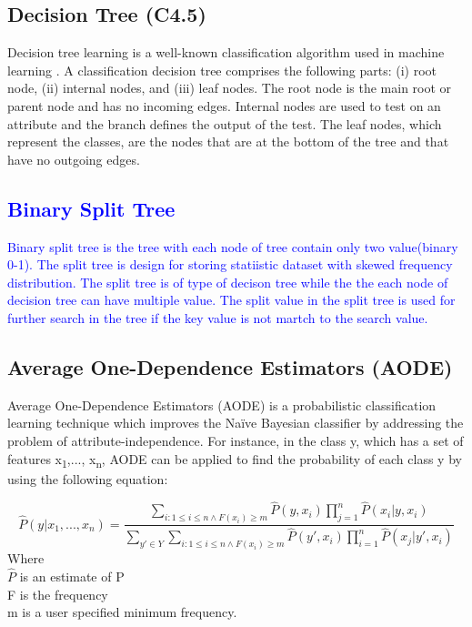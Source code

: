 \documentclass[review]{elsarticle}
\begin{document}
\subsection{Decision Tree (C4.5)}
\label{subsec:DT}
Decision tree learning is a well-known classification algorithm used in machine learning \cite{Quinlan1986}. A classification decision tree comprises the following parts: (i) root node, (ii) internal nodes, and (iii) leaf nodes. The root node is the main root or parent node and has no incoming edges. Internal nodes are used to test on an attribute and the branch defines the output of the test. The leaf nodes, which represent the classes, are the nodes that are at the bottom of the tree and that have no outgoing edges.
\textcolor{blue}{
\subsection{Binary Split Tree}
\label{subsec:BST}
Binary split tree is the tree with each node of tree contain only two value(binary 0-1). The split tree is design for storing statiistic dataset with skewed frequency distribution. The split tree is of type of decison tree while the the each node of decision tree can have multiple value. The split value in the split tree is used for further search in
the tree if the key value is not martch to the search value.  
}
\subsection{Average One-Dependence Estimators (AODE)}
\label{subsec:AODE}
Average One-Dependence Estimators (AODE) is a probabilistic classification learning technique which improves the Na\"ive Bayesian classifier \cite{Webb2005} by addressing the problem of attribute-independence. For instance, in the class y, which has a set of features x\textsubscript{1},..., x\textsubscript{n}, AODE can be applied to find the probability of each class y by using the following equation:
	
 	\begin{equation}
 	\hat{P}(y|x_1,...,x_n) = \dfrac{\sum_{i:1\leq i\leq n \wedge F(x_i) \geq m} \hat{P}(y,x_i)\prod_{j=1}^n \hat{P}(x_i|y,x_i)}{ \sum_{y'\in Y}  \sum_{i:1\leq i\leq n \wedge F(x_i) \geq m} \hat{P}(y',x_i) \prod_{i=1}^n \hat{P}(x_j|y',x_i) }
 	\label{AODE}
 	\end{equation}
 	Where \\
 	$\hat{P}$ is an estimate of P \\
 	F  is the frequency \\
 	m is a user specified minimum frequency.
\end{document}
